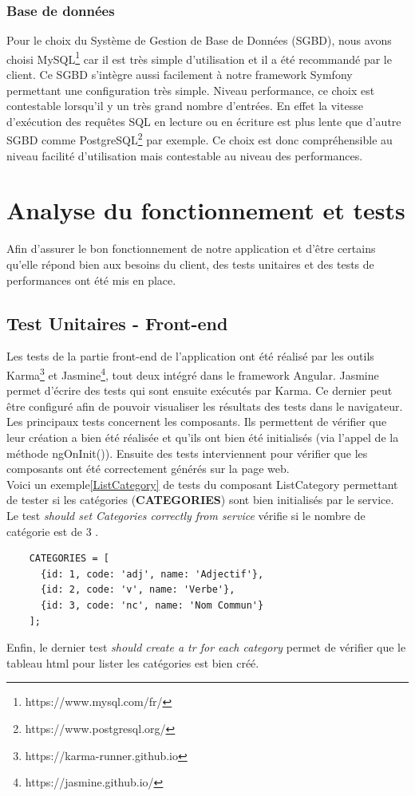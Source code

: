 \documentclass[12pt,a4paper]{article}
\begin{document}
\subsubsection{Base de données}

Pour le choix du Système de Gestion de Base de Données (SGBD), nous avons choisi MySQL\footnote{https://www.mysql.com/fr/} car il est très simple d'utilisation et il a été recommandé par le client.
Ce SGBD s'intègre aussi facilement à notre framework Symfony permettant une configuration très simple.
Niveau performance, ce choix est contestable lorsqu'il y un très grand nombre d'entrées. En effet la vitesse d'exécution des requêtes SQL en lecture ou en écriture est plus lente que d'autre SGBD comme PostgreSQL\footnote{https://www.postgresql.org/} par exemple.
Ce choix est donc compréhensible au niveau facilité d'utilisation mais contestable au niveau des performances.

\section{Analyse du fonctionnement et tests}

Afin d'assurer le bon fonctionnement de notre application et d'être certains qu'elle répond bien aux besoins du client, des tests unitaires et des tests de performances ont été mis en place.

\subsection{Test Unitaires - Front-end}

Les tests de la partie front-end de l'application ont été réalisé par les outils Karma\footnote{https://karma-runner.github.io} et Jasmine\footnote{https://jasmine.github.io/}, tout deux intégré dans le framework Angular.
Jasmine permet d'écrire des tests qui sont ensuite exécutés par Karma.
Ce dernier peut être configuré afin de pouvoir visualiser les résultats des tests dans le navigateur. \\
Les principaux tests concernent les composants. Ils permettent de vérifier que leur création a bien été réalisée et qu'ils ont bien été initialisés (via l'appel de la méthode ngOnInit()). 
Ensuite des tests interviennent pour vérifier que les composants ont été correctement générés sur la page web. \\
Voici un exemple\ref{ListCategory} de tests du composant ListCategory permettant de tester si les catégories (\textbf{CATEGORIES}) sont bien initialisés par le service.
Le test \textit{should set Categories correctly from service} vérifie si le nombre de catégorie est de 3 . 
\begin{verbatim}
    CATEGORIES = [
      {id: 1, code: 'adj', name: 'Adjectif'},
      {id: 2, code: 'v', name: 'Verbe'},
      {id: 3, code: 'nc', name: 'Nom Commun'}
    ];
\end{verbatim}
Enfin, le dernier test \textit{should create a tr for each category} permet de vérifier que le tableau html pour lister les catégories est bien créé.
\end{document}
